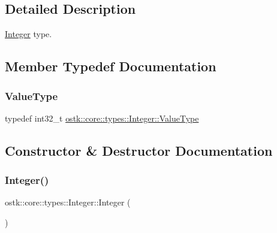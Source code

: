 \subsection{Detailed Description}
\hyperlink{classostk_1_1core_1_1types_1_1_integer}{Integer} type. 

\subsection{Member Typedef Documentation}
\mbox{\label{classostk_1_1core_1_1types_1_1_integer_a76a5f41f78659f116eafaf26cecc3244}} 
\subsubsection{\texorpdfstring{Value\+Type}{ValueType}}
{\footnotesize\ttfamily typedef int32\+\_\+t \hyperlink{classostk_1_1core_1_1types_1_1_integer_a76a5f41f78659f116eafaf26cecc3244}{ostk\+::core\+::types\+::\+Integer\+::\+Value\+Type}}



\subsection{Constructor \& Destructor Documentation}
\mbox{\label{classostk_1_1core_1_1types_1_1_integer_a209b939281106d4b590ad98fae291af9}} 
\subsubsection{\texorpdfstring{Integer()}{Integer()}\hspace{0.1cm}{\footnotesize\ttfamily [1/4]}}
{\footnotesize\ttfamily ostk\+::core\+::types\+::\+Integer\+::\+Integer (\begin{DoxyParamCaption}{ }\end{DoxyParamCaption})\hspace{0.3cm}{\ttfamily [delete]}}



